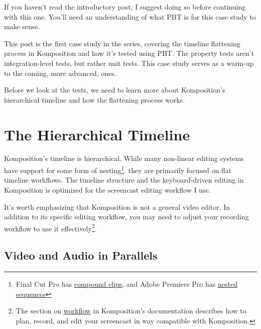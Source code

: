 If you haven't read the introductory post, I suggest doing so before continuing with this one. You'll need an understanding of what PBT is for this case study to make sense.

This post is the first case study in the series, covering the timeline flattening process in Komposition and how it's tested using PBT. The property tests aren't integration-level tests, but rather unit tests. This case study serves as a warm-up to the coming, more advanced, ones.

Before we look at the tests, we need to learn more about Komposition's hierarchical timeline and how the flattening process works.

\section{The Hierarchical Timeline}

Komposition's timeline is hierarchical. While many non-linear editing systems have support for some form of nesting\footnote{Final Cut Pro has \href{https://support.apple.com/kb/PH12631?locale=en_US}{compound clips}, and Adobe Premiere Pro has \href{https://www.premiumbeat.com/blog/nesting-in-adobe-premiere-pro/}{nested sequences}}. they are primarily focused on flat timeline workflows. The timeline structure and the keyboard-driven editing in Komposition is optimized for the screencast editing workflow I use.

It's worth emphasizing that Komposition is not a general video editor. In addition to its specific editing workflow, you may need to adjust your recording workflow to use it effectively\footnote{The section on \href{https://owickstrom.github.io/komposition/user-guide/workflow/}{workflow} in Komposition's documentation describes how to plan, record, and edit your screencast in way compatible with Komposition.}.

\subsection{Video and Audio in Parallels}

